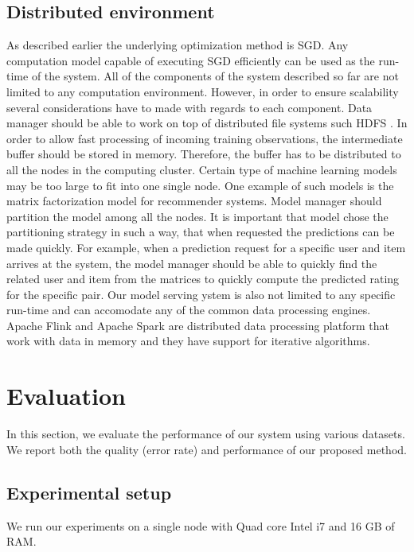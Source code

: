 \documentclass{sig-alternate-05-2015}
\begin{document}
\subsection{Distributed environment} 
As described earlier the underlying optimization method is SGD.
Any computation model capable of executing SGD efficiently can be used as the run-time of the system.
All of the components of the system described so far are not limited to any computation environment.
However, in order to ensure scalability several considerations have to made with regards to each component.
Data manager should be able to work on top of distributed file systems such HDFS \cite{shvachko2010hadoop}. 
In order to allow fast processing of incoming training observations, the intermediate buffer should be stored in memory.
Therefore, the buffer has to be distributed to all the nodes in the computing cluster.
Certain type of machine learning models may be too large to fit into one single node.
One example of such models is the matrix factorization model for recommender systems.
Model manager should partition the model among all the nodes.
It is important that model chose the partitioning strategy in such a way, that when requested the predictions can be made quickly.
For example, when a prediction request for a specific user and item arrives at the system, the model manager should be able to quickly find the related user and item from the matrices to quickly compute the predicted rating for the specific pair.
Our model serving ystem is also not limited to any specific run-time and can accomodate any of the common data processing engines.
Apache Flink \cite{carbone2015apache, alexandrov2014stratosphere} and Apache Spark \cite{zaharia2010spark} are distributed data processing platform that work with data in memory and they have support for iterative algorithms.


\section{Evaluation} \label{evaluation} 
In this section, we evaluate the performance of our system using various datasets. 
We report both the quality (error rate) and performance of our proposed method. 

\subsection{Experimental setup}
We run our experiments on a single node with Quad core Intel i7 and 16 GB of RAM. 
\end{document}
